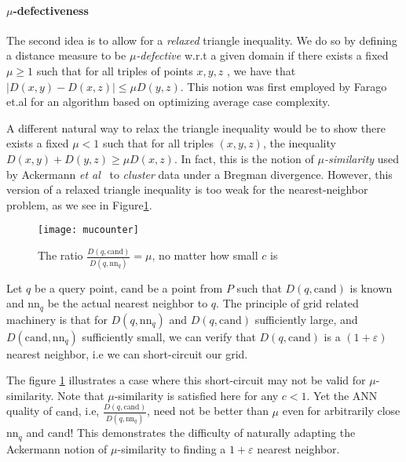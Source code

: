 \documentclass[11pt]{myclass}
\newcommand{\eps}{\varepsilon}
\newcommand{\etal}{\emph{et al}\xspace}
\begin{document}
\paragraph{$\mu$-defectiveness}

The second idea is to allow for a \emph{relaxed} triangle inequality. We do so by defining a distance measure to be 
\emph{$\mu$-defective} w.r.t a given domain if there exists a fixed $\mu \ge 1$ such that for all triples of points $x,y,z$ , we have that
$|D(x,y) - D(x,z)| \le \mu D(y,z)$. This notion was first employed by Farago et.al \cite{firstdefect} for an algorithm based on optimizing average case
complexity. 

A different natural way to relax the triangle inequality would be to show there exists a fixed $\mu < 1$ such that 
for all triples $(x,y,z)$, the inequality $D(x,y) + D(y,z) \ge \mu D(x,z)$. In fact, this is the notion of \emph{$\mu$-similarity} used by 
Ackermann \etal~\cite{musimilarcoresets}  to \emph{cluster} data under a Bregman divergence. However, this version of a relaxed triangle inequality 
is too weak for the nearest-neighbor problem, as we see in Figure\ref{counter}. 

\begin{figure}[H]
  \begin{center}
    \texttt{[image: mucounter]}
  \end{center}
  \caption{The ratio $\frac{D(q,\text{cand})}{D(q,\text{nn}_q)} = \mu$, no matter how small $c$ is}
  \label{counter}
\end{figure}

Let $q$ be a query point, $\text{cand}$ be a point from $P$ such that $D(q,\text{cand})$ is known and $\text{nn}_q$ 
be the actual nearest neighbor to $q$. The principle of grid related machinery is that for $D(q, \text{nn}_q)$ and $D(q,\text{cand})$ sufficiently 
large, and $D(\text{cand}, \text{nn}_q)$ sufficiently small, we can verify that $D(q,\text{cand})$ is a $(1+ \eps)$ nearest neighbor, 
i.e we can short-circuit our grid. 

The figure \ref{counter} illustrates a case where this short-circuit may not be valid for $\mu$-similarity. Note that $\mu$-similarity is satisfied 
here for any $c <1$. Yet the ANN quality of $\text{cand}$, i.e, $\frac{D(q,\text{cand}) }{ D(q, \text{nn}_q)}$, need not be better than $\mu$ even 
for arbitrarily close $\text{nn}_q$ and $\text{cand}$! This demonstrates the difficulty of naturally 
adapting the Ackermann notion of $\mu$-similarity to finding a $1 + \eps$ nearest neighbor.
\end{document}
